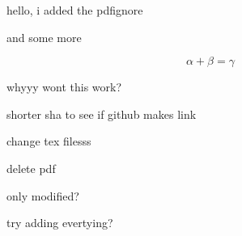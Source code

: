 \documentclass{article}
\begin{document}
hello, i added the pdfignore

and some more

$$\alpha + \beta = \gamma$$


whyyy wont this work?

shorter sha to see if github makes link

change tex filesss

delete pdf

only modified?

try adding evertying?
\end{document}

